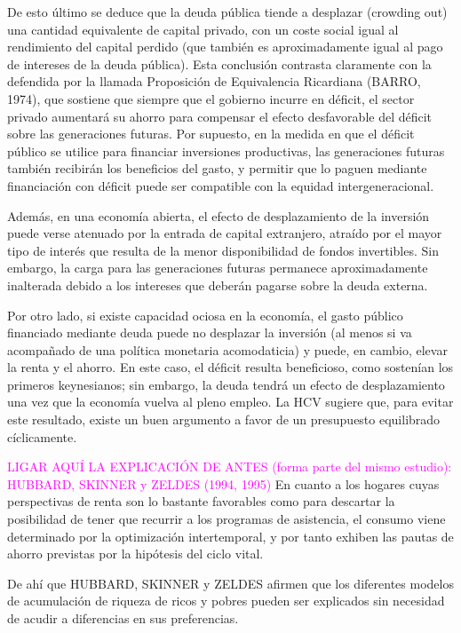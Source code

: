 \documentclass[10pt,a4paper]{article}
\begin{document}
De esto último se deduce que la deuda pública tiende a desplazar (crowding out) una cantidad equivalente de capital privado, con un coste social igual al rendimiento del capital perdido (que también es aproximadamente igual al pago de intereses de la deuda pública). Esta conclusión contrasta claramente con la defendida por la llamada Proposición de Equivalencia Ricardiana (BARRO, 1974), que sostiene que siempre que el gobierno incurre en déficit, el sector privado aumentará su ahorro para compensar el efecto desfavorable del déficit sobre las generaciones futuras. Por supuesto, en la medida en que el déficit público se utilice para financiar inversiones productivas, las generaciones futuras también recibirán los beneficios del gasto, y permitir que lo paguen mediante financiación con déficit puede ser compatible con la equidad intergeneracional.

Además, en una economía abierta, el efecto de desplazamiento de la inversión puede verse atenuado por la entrada de capital extranjero, atraído por el mayor tipo de interés que resulta de la menor disponibilidad de fondos invertibles. Sin embargo, la carga para las generaciones futuras permanece aproximadamente inalterada debido a los intereses que deberán pagarse sobre la deuda externa.

Por otro lado, si existe capacidad ociosa en la economía, el gasto público financiado mediante deuda puede no desplazar la inversión (al menos si va acompañado de una política monetaria acomodaticia) y puede, en cambio, elevar la renta y el ahorro. En este caso, el déficit resulta beneficioso, como sostenían los primeros keynesianos; sin embargo, la deuda tendrá un efecto de desplazamiento una vez que la economía vuelva al pleno empleo. La HCV sugiere que, para evitar este resultado, existe un buen argumento a favor de un presupuesto equilibrado cíclicamente.

\textcolor{magenta}{LIGAR AQUÍ LA EXPLICACIÓN DE ANTES (forma parte del mismo estudio): HUBBARD, SKINNER y ZELDES (1994, 1995)} En cuanto a los hogares cuyas perspectivas de renta son lo bastante favorables como para descartar la posibilidad de tener que recurrir a los programas de asistencia, el consumo viene determinado por la optimización intertemporal, y por tanto exhiben las pautas de ahorro previstas por la hipótesis del ciclo vital. 

De ahí que HUBBARD, SKINNER y ZELDES afirmen que los diferentes modelos de acumulación de riqueza de ricos y pobres pueden ser explicados sin necesidad de acudir a diferencias en sus preferencias.
\end{document}
